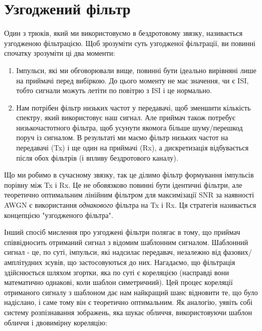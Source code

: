 \section{Узгоджений
фільтр}\label{ux443ux437ux433ux43eux434ux436ux435ux43dux438ux439-ux444ux456ux43bux44cux442ux440}

Один з трюків, який ми використовуємо в бездротовому
зв\textquotesingle язку, називається узгодженою фільтрацією. Щоб
зрозуміти суть узгодженої фільтрації, ви повинні спочатку зрозуміти ці
два моменти:

\begin{enumerate}
\def\labelenumi{\arabic{enumi}.}
\tightlist
\item
  Імпульси, які ми обговорювали вище, повинні бути ідеально вирівняні
  лише на приймачі перед вибіркою. До цього моменту не має значення, чи
  є ISI, тобто сигнали можуть летіти по повітрю з ISI і це нормально.
\item
  Нам потрібен фільтр низьких частот у передавачі, щоб зменшити
  кількість спектру, який використовує наш сигнал. Але приймач також
  потребує низькочастотного фільтра, щоб усунути якомога більше
  шуму/перешкод поруч із сигналом. В результаті ми маємо фільтр низьких
  частот на передавачі (Tx) і ще один на приймачі (Rx), а дискретизація
  відбувається після обох фільтрів (і впливу бездротового каналу).
\end{enumerate}

Що ми робимо в сучасному зв\textquotesingle язку, так це ділимо фільтр
формування імпульсів порівну між Tx і Rx. Це не
обов\textquotesingle язково повинні бути ідентичні фільтри, але
теоретично оптимальним лінійним фільтром для максимізації SNR за
наявності AWGN є використання \emph{однакового} фільтра на Tx і Rx. Ця
стратегія називається концепцією "узгодженого фільтра".

Інший спосіб мислення про узгоджені фільтри полягає в тому, що приймач
співвідносить отриманий сигнал з відомим шаблонним сигналом. Шаблонний
сигнал - це, по суті, імпульси, які надсилає передавач, незалежно від
фазових/амплітудних зсувів, що застосовуються до них. Нагадаємо, що
фільтрація здійснюється шляхом згортки, яка по суті є кореляцією
(насправді вони математично однакові, коли шаблон симетричний). Цей
процес кореляції отриманого сигналу з шаблоном дає нам найкращий шанс
відновити те, що було надіслано, і саме тому він є теоретично
оптимальним. Як аналогію, уявіть собі систему розпізнавання зображень,
яка шукає обличчя, використовуючи шаблон обличчя і двовимірну кореляцію:

